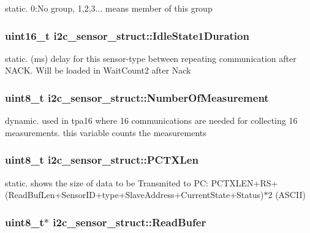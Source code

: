 static. 0\-:No group, 1,2,3... means member of this group \hypertarget{structi2c__sensor__struct_a89f2543f08f41a1a4e9d9f2021150e33}{
\subsubsection[{Idle\-State1\-Duration}]{\setlength{\rightskip}{0pt plus 5cm}uint16\-\_\-t i2c\-\_\-sensor\-\_\-struct\-::\-Idle\-State1\-Duration}}\label{structi2c__sensor__struct_a89f2543f08f41a1a4e9d9f2021150e33}
static. (ms) delay for this sensor-\/type between repeating communication after N\-A\-C\-K. Will be loaded in Wait\-Count2 after Nack \hypertarget{structi2c__sensor__struct_ab34ec9d3dc7b6892fb6320f7d4f8ad91}{
\subsubsection[{Number\-Of\-Measurement}]{\setlength{\rightskip}{0pt plus 5cm}uint8\-\_\-t i2c\-\_\-sensor\-\_\-struct\-::\-Number\-Of\-Measurement}}\label{structi2c__sensor__struct_ab34ec9d3dc7b6892fb6320f7d4f8ad91}
dynamic. used in tpa16 where 16 communications are needed for collecting 16 measurements. this variable counts the measurements \hypertarget{structi2c__sensor__struct_aafadf5bca4a3837e4afff6994d402cd9}{
\subsubsection[{P\-C\-T\-X\-Len}]{\setlength{\rightskip}{0pt plus 5cm}uint8\-\_\-t i2c\-\_\-sensor\-\_\-struct\-::\-P\-C\-T\-X\-Len}}\label{structi2c__sensor__struct_aafadf5bca4a3837e4afff6994d402cd9}
static. shows the size of data to be Transmited to P\-C\-: P\-C\-T\-X\-L\-E\-N+\-R\-S+(Read\-Buf\-Len+\-Sensor\-I\-D+type+\-Slave\-Address+\-Current\-State+\-Status)$\ast$2 (A\-S\-C\-I\-I) \hypertarget{structi2c__sensor__struct_a18577170561310931a1b3aead28a92ee}{
\subsubsection[{Read\-Bufer}]{\setlength{\rightskip}{0pt plus 5cm}uint8\-\_\-t$\ast$ i2c\-\_\-sensor\-\_\-struct\-::\-Read\-Bufer}}\label{structi2c__sensor__struct_a18577170561310931a1b3aead28a92ee}
